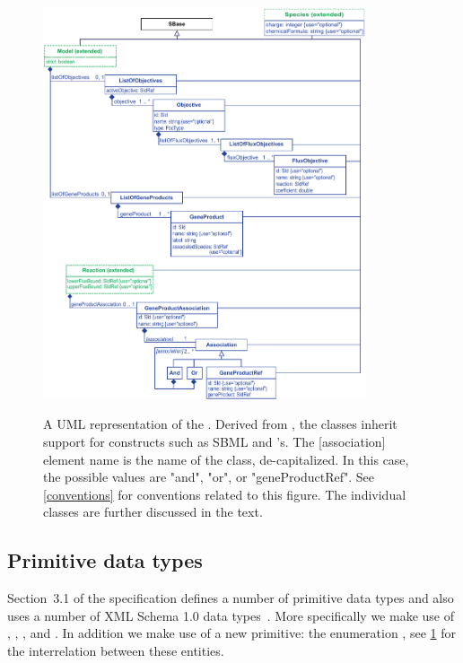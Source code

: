 \begin{figure}[ht!]
  \centering
  \includegraphics[width=0.85\textwidth]{images/v3harmony_fbc_uml.pdf}\\
  \caption{A UML representation of the \FBCPackage. Derived from \SBase, the
	\FBC classes inherit support for constructs such as SBML \Notes and
	\Annotation's. The [association] element name is the name of the class, de-capitalized.  In this case, the possible values are "and", "or", or "geneProductRef". See \ref{conventions} for conventions related to this figure.
	The individual classes are further discussed in the text.}
  \label{fig:fbc_uml}
\end{figure}

\subsection{Primitive data types}
\label{primtypes}

Section~3.1 of the \sbmlthreecore specification defines a number of primitive
data types and also uses a number of XML Schema 1.0 data types~\citep{biron:2000}.
More specifically we make use of , ,
,  and . In addition we make
use of a new primitive: the enumeration , see \ref{fig:fbc_uml}
for the interrelation between
these entities.

